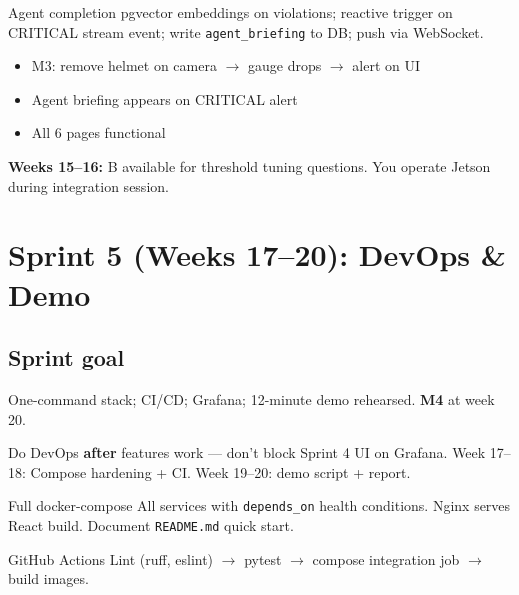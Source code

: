 \documentclass[12pt,a4paper]{report}
\begin{document}
\begin{stepbox}{Agent completion}
pgvector embeddings on violations; reactive trigger on CRITICAL stream event; write \texttt{agent\_briefing} to DB; push via WebSocket.
\end{stepbox}

\begin{verifybox}
\begin{itemize}
    \item[$\square$] M3: remove helmet on camera $\rightarrow$ gauge drops $\rightarrow$ alert on UI
    \item[$\square$] Agent briefing appears on CRITICAL alert
    \item[$\square$] All 6 pages functional
\end{itemize}
\end{verifybox}

\begin{collabbox}
\textbf{Weeks 15--16:} B available for threshold tuning questions. You operate Jetson during integration session.
\end{collabbox}

\chapter{Sprint 5 (Weeks 17--20): DevOps \& Demo}

\section{Sprint goal}

One-command stack; CI/CD; Grafana; 12-minute demo rehearsed. \textbf{M4} at week 20.

\begin{approachbox}
Do DevOps \textbf{after} features work --- don't block Sprint 4 UI on Grafana. Week 17--18: Compose hardening + CI. Week 19--20: demo script + report.
\end{approachbox}

\begin{stepbox}{Full docker-compose}
All services with \texttt{depends\_on} health conditions. Nginx serves React build. Document \texttt{README.md} quick start.
\end{stepbox}

\begin{stepbox}{GitHub Actions}
Lint (ruff, eslint) $\rightarrow$ pytest $\rightarrow$ compose integration job $\rightarrow$ build images.
\end{stepbox}
\end{document}
